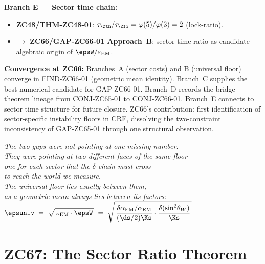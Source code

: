 \documentclass[12pt, a4paper]{article}
\renewcommand{\epsEM}{\varepsilon_{\rm EM}}
\renewcommand{\swsq}{\sin^2\!\theta_W}
\renewcommand{\aEM}{\alpha_{\rm EM}}
\begin{document}
\begin{genealogybox}[title={How ZC66's Key Objects Trace Back}]
\textbf{Branch E --- Sector time chain:}
\begin{itemize}[leftmargin=2em, noitemsep]
  \item \textbf{ZC48/THM-ZC48-01}:
    $\tau_{\Zth}/\tau_{\Zfi} = \varphi(5)/\varphi(3) = 2$ (lock-ratio).
  \item $\to$ \textbf{ZC66/GAP-ZC66-01 Approach~B}:
    sector time ratio as candidate algebraic origin of
    $\epsW/\epsEM$.
\end{itemize}

\textbf{Convergence at ZC66:}
Branches~A (sector costs) and B (universal floor) converge in
FIND-ZC66-01 (geometric mean identity).
Branch~C supplies the best numerical candidate for GAP-ZC66-01.
Branch~D records the bridge theorem lineage from CONJ-ZC65-01
to CONJ-ZC66-01.
Branch~E connects to sector time structure for future closure.
ZC66's contribution: first identification of sector-specific
instability floors in CRF, dissolving the two-constraint
inconsistency of GAP-ZC65-01 through one structural observation.
\end{genealogybox}


\bigskip
\begin{center}
\textit{%
  The two gaps were not pointing at one missing number.\\
  They were pointing at two different faces of the same floor ---\\
  one for each sector that the $\delta$-chain must cross\\
  to reach the world we measure.\\[0.5em]
  The universal floor lies exactly between them,\\
  as a geometric mean always lies between its factors:\\[0.5em]
  $\displaystyle
  \epsuniv
  \;=\;
  \sqrt{\,\epsEM\cdot\epsW\,}
  \;=\;
  \sqrt{\,
    \frac{\delta\aEM/\aEM}{(\ds/2)\Ks}
    \cdot
    \frac{\delta(\swsq)}{\Ks}
  \,}
  $
}
\end{center}



\section{ZC67: The Sector Ratio Theorem}
\end{document}

